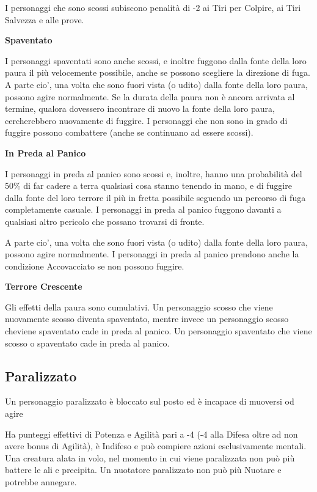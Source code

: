 \documentclass[a4paper,11pt,twoside,openany]{book}
\begin{document}
I personaggi che sono scossi subiscono penalità di -2 ai Tiri per Colpire, ai Tiri Salvezza e alle prove.

\textbf{Spaventato}

I personaggi spaventati sono anche scossi, e inoltre fuggono dalla fonte della loro paura il più velocemente possibile, anche se possono scegliere la direzione di fuga. A parte cio', una volta che sono fuori vista (o udito) dalla fonte della loro paura, possono agire normalmente. Se la durata della paura non è ancora arrivata al termine, qualora dovessero incontrare di nuovo la fonte della loro paura, cercherebbero nuovamente di fuggire. I personaggi che non sono in grado di fuggire possono combattere (anche se continuano ad essere scossi).

\textbf{In Preda al Panico}

I personaggi in preda al panico sono scossi e, inoltre, hanno una probabilità del 50\% di far cadere a terra qualsiasi cosa stanno tenendo in mano, e di fuggire dalla fonte del loro terrore il più in fretta possibile seguendo un percorso di fuga completamente casuale. I personaggi in preda al panico fuggono davanti a qualsiasi altro pericolo che possano trovarsi di fronte.

A parte cio', una volta che sono fuori vista (o udito) dalla fonte della loro paura, possono agire normalmente. I personaggi in preda al panico prendono anche la condizione Accovacciato se non possono fuggire.

\textbf{Terrore Crescente}

Gli effetti della paura sono cumulativi. Un personaggio scosso che viene nuovamente scosso diventa spaventato, mentre invece un personaggio scosso cheviene spaventato cade in preda al panico. Un personaggio spaventato che viene scosso o spaventato cade in preda al panico.


\subsection{Paralizzato}

\label{paralizzato}

Un personaggio paralizzato è bloccato sul posto ed è incapace di muoversi od agire

Ha punteggi effettivi di Potenza e Agilità pari a -4 (-4 alla Difesa oltre ad non avere bonus di Agilità), è Indifeso e può compiere azioni esclusivamente mentali. Una creatura alata in volo, nel momento in cui viene paralizzata non può più battere le ali e precipita. Un nuotatore paralizzato non può più Nuotare e potrebbe annegare.
\end{document}
